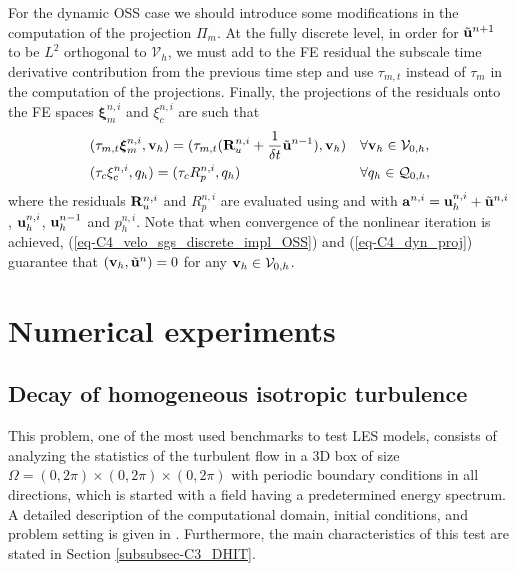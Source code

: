 For the dynamic OSS case we should introduce some modifications in the computation of the projection $\Pi_m$. At the fully discrete level, in order for $\tilde{{\bf u}}^{n+1}$ to be $L^2$ orthogonal to $\mathcal{V}_{h}$, we must add to the FE residual the subscale time derivative contribution from the previous time step and use $\tau_{m,t}$ instead of $\tau_m$ in the computation of the projections. Finally, the projections of the residuals onto the FE spaces $\boldsymbol{\xi}_m^{n,i}$ and $\xi_c^{n,i}$ are such that
\begin{align}
\label{eq-C4_dyn_proj}
&(\tau_{m,t}\boldsymbol{\xi}_m^{n,i},{\bf v}_h)=(\tau_{m,t}({\bf R}_u^{n,i}+\frac{1}{\delta t} \tilde{\mathbf{u}}^{n-1}),{\bf v}_h)&&\forall{\bf v}_h\in\mathcal{V}_{0,h},\\
&(\tau_c\xi_c^{n,i},q_h)=(\tau_c R_p^{n,i},q_h)&&\forall q_h\in\mathcal{Q}_{0,h},
\end{align}
where the residuals ${\bf R}_u^{n,i}$ and $R_p^{n,i}$ are evaluated using  and  with ${\bf a}^{n,i}={\bf u}_h^{n,i}+\tilde{{\bf u}}^{n,i}$, ${\bf u}_h^{n,i}$, ${\bf u}_h^{n-1}$ and $p_h^{n,i}$. %
 Note that when convergence of the nonlinear iteration is achieved, (\ref{eq-C4_velo_sgs_discrete_impl_OSS}) and (\ref{eq-C4_dyn_proj}) guarantee that $({\bf v}_h,\tilde{\mathbf{u}}^{n}) = 0$ for any ${\bf v}_h\in\mathcal{V}_{0,h}$.

\section{Numerical experiments}
\label{sec-C4_experiments}
\subsection{Decay of homogeneous isotropic turbulence}
\label{subsec-C4_DHIT}
This problem, one of the most used benchmarks to test LES models, consists of analyzing the statistics of the turbulent flow in a 3D box of size $\Omega=(0,2\pi)\times(0,2\pi)\times(0,2\pi)$ with periodic boundary conditions in all directions, which is started with a field having a predetermined energy spectrum. A detailed description of the computational domain, initial conditions, and problem setting is given in \cite{mansour_decay_1994}. Furthermore, the main characteristics of this test are stated in Section \ref{subsubsec-C3_DHIT}.

